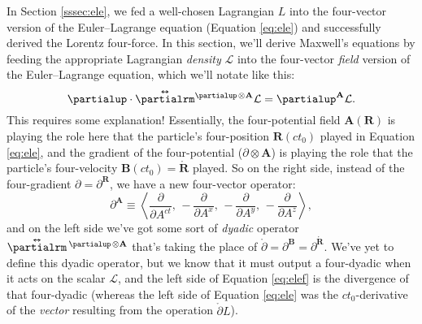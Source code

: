 \documentclass[12pt]{article}
\renewcommand{\vv}[1]{\mathbf{#1}}
\newcommand{\tightoverset}[2]{%
  \mathop{#2}\limits^{\vbox to -.5ex{\kern-0.75ex\hbox{$#1$}\vss}}}
\newcommand{\inlinedy}[1]{\tightoverset{\text{\tiny$\bm\leftrightarrow$}}{#1}}
\newcommand{\capdy}[1]{ \overset{ \text{\tiny$\bm\leftrightarrow$} }{\vphantom{\text{\small{A}}}\smash{#1}} }
\begin{document}
In Section \ref{sssec:ele}, we fed a well-chosen Lagrangian $L$ into the four-vector version of the Euler--Lagrange equation (Equation \ref{eq:ele}) and successfully derived the Lorentz four-force. In this section, we'll derive Maxwell's equations by feeding the appropriate Lagrangian \emph{density} $\mathcal{L}$ into the four-vector \emph{field} version of the Euler--Lagrange equation, which we'll notate like this:
\begin{equation}\label{eq:elef}
\partialup \cdot \capdy{\partialrm} {}^{\partialup \mkern2mu \otimes \vv A} \mathcal{L} = \partialup^{\vv A} \mathcal{L} .
\end{equation}
This requires some explanation! Essentially, the four-potential field ${\vv A (\vv R)}$ is playing the role here that the particle's four-position $\vv R (ct_0)$ played in Equation \ref{eq:ele}, and the gradient of the four-potential ($\partialup \otimes \vv A$) is playing the role that the particle's four-velocity $\vv B (ct_0) = \mathring{\vv R}$ played. So on the right side, instead of the four-gradient $\partialup = \partialup^{\vv R}$, we have a new four-vector operator:
\begin{equation*}
\partialup^{\vv A} \equiv \left \langle \dfrac{\partial}{\partial A^{ct}} , \,  - \dfrac{\partial}{\partial A^x} , \, - \dfrac{\partial}{\partial A^y} , \, - \dfrac{\partial}{\partial A^z} \right \rangle ,
\end{equation*}
and on the left side we've got some sort of \emph{dyadic} operator $\inlinedy{\partialrm} {}^{\partialup \mkern2mu \otimes \vv A}$ that's taking the place of $\mathring{\partialup} = \partialup^{\vv B} = \partialup^{\mathring{\vv R}}$. We've yet to define this dyadic operator, but we know that it must output a four-dyadic when it acts on the scalar $\mathcal{L}$, and the left side of Equation \ref{eq:elef} is the divergence of that four-dyadic (whereas the left side of Equation \ref{eq:ele} was the $ct_0$-derivative of the \emph{vector} resulting from the operation $\mathring{\partialup} L$).
\end{document}
